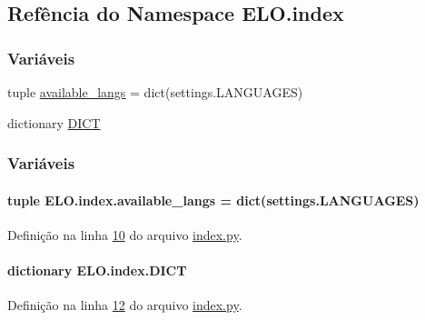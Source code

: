 \hypertarget{namespaceELO_1_1index}{\subsection{Refência do Namespace E\-L\-O.\-index}
\label{namespaceELO_1_1index}
}
\subsubsection*{Variáveis}
\begin{DoxyCompactItemize}
\item 
tuple \hyperlink{namespaceELO_1_1index_aae899027d156c2d530d8eaead5e0a990}{available\-\_\-langs} = dict(settings.\-L\-A\-N\-G\-U\-A\-G\-E\-S)
\item 
dictionary \hyperlink{namespaceELO_1_1index_ada538ef183be3fce6bc34d0714e4e8cb}{D\-I\-C\-T}
\end{DoxyCompactItemize}


\subsubsection{Variáveis}
\hypertarget{namespaceELO_1_1index_aae899027d156c2d530d8eaead5e0a990}{
\paragraph[{available\-\_\-langs}]{\setlength{\rightskip}{0pt plus 5cm}tuple E\-L\-O.\-index.\-available\-\_\-langs = dict(settings.\-L\-A\-N\-G\-U\-A\-G\-E\-S)}}\label{namespaceELO_1_1index_aae899027d156c2d530d8eaead5e0a990}


Definição na linha \hyperlink{index_8py_source_l00010}{10} do arquivo \hyperlink{index_8py_source}{index.\-py}.

\hypertarget{namespaceELO_1_1index_ada538ef183be3fce6bc34d0714e4e8cb}{
\paragraph[{D\-I\-C\-T}]{\setlength{\rightskip}{0pt plus 5cm}dictionary E\-L\-O.\-index.\-D\-I\-C\-T}}\label{namespaceELO_1_1index_ada538ef183be3fce6bc34d0714e4e8cb}


Definição na linha \hyperlink{index_8py_source_l00012}{12} do arquivo \hyperlink{index_8py_source}{index.\-py}.

